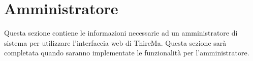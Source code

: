 \section{Amministratore}
Questa sezione contiene le informazioni necessarie ad un amministratore di sistema per utilizzare l'interfaccia web di ThireMa. Questa sezione sarà completata quando saranno implementate le funzionalità per l'amministratore.

